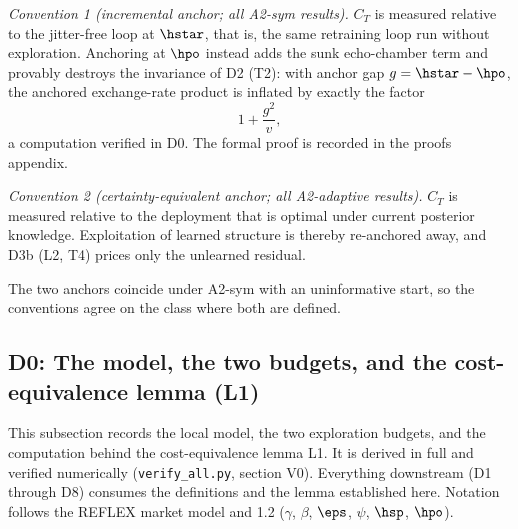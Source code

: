 \emph{Convention 1 (incremental anchor; all A2-sym results).} $C_T$ is
measured relative to the jitter-free loop at $\hstar$, that is, the same
retraining loop run without exploration. Anchoring at $\hpo$ instead adds
the sunk echo-chamber term and provably destroys the invariance of D2 (T2):
with anchor gap $g = \hstar - \hpo$, the anchored exchange-rate product is
inflated by exactly the factor
\begin{equation*}
1 + \frac{g^2}{v},
\end{equation*}
a computation verified in D0. The formal proof is recorded in the proofs
appendix.

\emph{Convention 2 (certainty-equivalent anchor; all A2-adaptive results).}
$C_T$ is measured relative to the deployment that is optimal under current
posterior knowledge. Exploitation of learned structure is thereby
re-anchored away, and D3b (L2, T4) prices only the unlearned residual.

The two anchors coincide under A2-sym with an uninformative start, so the
conventions agree on the class where both are defined.

\subsection*{D0: The model, the two budgets, and the cost-equivalence lemma (L1)}

This subsection records the local model, the two exploration budgets, and the
computation behind the cost-equivalence lemma L1. It is derived in full and
verified numerically (\texttt{verify\_all.py}, section V0). Everything
downstream (D1 through D8) consumes the definitions and the lemma established
here. Notation follows the REFLEX market model \citep{reflex2026} and 1.2 ($\gamma$, $\beta$, $\eps$,
$\psi$, $\hsp$, $\hpo$).

